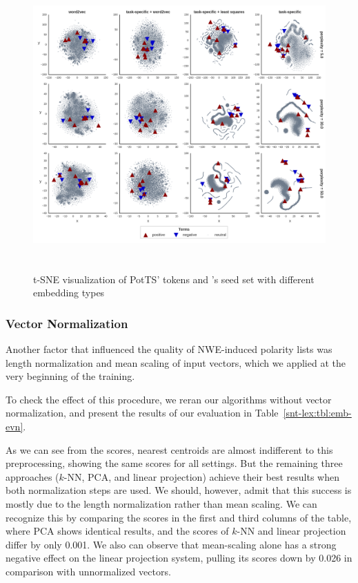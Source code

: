 \begin{figure}[bht]
  \centering
  \includegraphics[height=30em,width=\linewidth]{img/potts_embeddings.png}
  \caption[\citeauthor{Turney:03}'s seed
    set]{t-SNE visualization of PotTS' tokens and
    \citeauthor{Turney:03}'s seed set with different embedding
    types}\label{snt:fig:tsne-seeds}
\end{figure}

\subsubsection{Vector Normalization}\label{subsec:snt-lex:eowet}

Another factor that influenced the quality of NWE-induced polarity
lists was length normalization and mean scaling of input vectors,
which we applied at the very beginning of the training.

To check the effect of this procedure, we reran our algorithms without
vector normalization, and present the results of our evaluation in
Table~\ref{snt-lex:tbl:emb-evn}.

As we can see from the scores, nearest centroids are almost
indifferent to this preprocessing, showing the same scores for all
settings.  But the remaining three approaches ($k$-NN, PCA, and linear
projection) achieve their best results when both normalization steps
are used.  We should, however, admit that this success is mostly due
to the length normalization rather than mean scaling.  We can
recognize this by comparing the scores in the first and third columns
of the table, where PCA shows identical results, and the scores of
$k$-NN and linear projection differ by only 0.001.  We also can
observe that mean-scaling alone has a strong negative effect on the
linear projection system, pulling its scores down by 0.026 in
comparison with unnormalized vectors.

